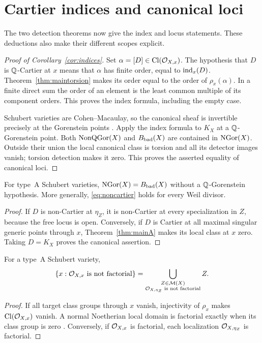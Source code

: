 \section{Cartier indices and canonical loci}\label{sec:consequences}

The two detection theorems now give the index and locus statements. These deductions also make their different scopes explicit.

\begin{proof}[Proof of Corollary~\ref{cor:indices}]
Set $\alpha=[D]\in\operatorname{Cl}(\mathcal O_{X,x})$. The hypothesis that $D$ is $\mathbb Q$-Cartier at $x$ means that $\alpha$ has finite order, equal to $\operatorname{ind}_x(D)$. Theorem~\ref{thm:maintorsion} makes its order equal to the order of $\rho_x(\alpha)$. In a finite direct sum the order of an element is the least common multiple of its component orders. This proves the index formula, including the empty case.

Schubert varieties are Cohen--Macaulay, so the canonical sheaf is invertible precisely at the Gorenstein points \cite[Chapter~3]{BH93}\cite[Tag 0DW9]{The26}. Apply the index formula to $K_X$ at a $\mathbb Q$-Gorenstein point. Both $\operatorname{NonQGor}(X)$ and $B_{\mathrm{bad}}(X)$ are contained in $\operatorname{NGor}(X)$. Outside their union the local canonical class is torsion and all its detector images vanish; torsion detection makes it zero. This proves the asserted equality of canonical loci.
\end{proof}

\begin{corollary}\label{cor:typeA-locus}
For type~A Schubert varieties, $\operatorname{NGor}(X)=B_{\mathrm{bad}}(X)$ without a $\mathbb Q$-Gorenstein hypothesis. More generally, \eqref{eq:noncartier} holds for every Weil divisor.
\end{corollary}
\begin{proof}
If $D$ is non-Cartier at $\eta_Z$, it is non-Cartier at every specialization in $Z$, because the free locus is open. Conversely, if $D$ is Cartier at all maximal singular generic points through $x$, Theorem~\ref{thm:mainA} makes its local class at $x$ zero. Taking $D=K_X$ proves the canonical assertion.
\end{proof}

\begin{corollary}\label{cor:factorial}
For a type~A Schubert variety,
\[
 \{x:\mathcal O_{X,x}\text{ is not factorial}\}
 =\bigcup_{\substack{Z\in\mathcal M(X)\\\mathcal O_{X,\eta_Z}\text{ is not factorial}}}Z.
\]
\end{corollary}
\begin{proof}
If all target class groups through $x$ vanish, injectivity of $\rho_x$ makes $\operatorname{Cl}(\mathcal O_{X,x})$ vanish. A normal Noetherian local domain is factorial exactly when its class group is zero \cite{Fos73}. Conversely, if $\mathcal O_{X,x}$ is factorial, each localization $\mathcal O_{X,\eta_Z}$ is factorial.
\end{proof}

